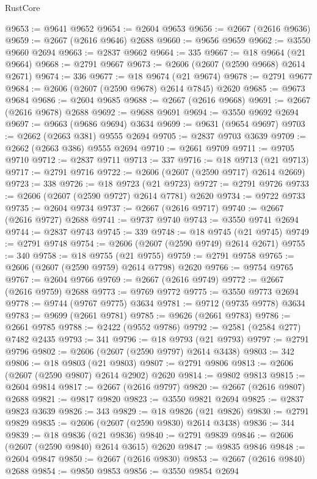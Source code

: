 \begin{lexlean}{RustCore}
\begin{coremodule}
@9653 := @9641 @9652
@9654 := @2604 @9653
@9656 := @2667 (@2616 @9636)
@9659 := @2667 (@2616 @9646) @2688
@9660 := @9656 @9659
@9662 := @3550 @9660 @2694
@9663 := @2837 @9662
@9664 := 335
@9667 := @18 @9664 (@21 @9664)
@9668 := @2791 @9667
@9673 := @2606 (@2607 (@2590 @9668) @2614 @2671)
@9674 := 336
@9677 := @18 @9674 (@21 @9674)
@9678 := @2791 @9677
@9684 := @2606 (@2607 (@2590 @9678) @2614 @7845) @2620
@9685 := @9673 @9684
@9686 := @2604 @9685
@9688 := @2667 (@2616 @9668)
@9691 := @2667 (@2616 @9678) @2688
@9692 := @9688 @9691
@9694 := @3550 @9692 @2694
@9697 := @9663 (@9686 @9694) @3634
@9699 := @9631 (@9654 @9697)
@9703 := @2662 (@2663 @381) @9555 @2694
@9705 := @2837 @9703 @3639
@9709 := @2662 (@2663 @386) @9555 @2694
@9710 := @2661 @9709
@9711 := @9705 @9710
@9712 := @2837 @9711
@9713 := 337
@9716 := @18 @9713 (@21 @9713)
@9717 := @2791 @9716
@9722 := @2606 (@2607 (@2590 @9717) @2614 @2669)
@9723 := 338
@9726 := @18 @9723 (@21 @9723)
@9727 := @2791 @9726
@9733 := @2606 (@2607 (@2590 @9727) @2614 @7781) @2620
@9734 := @9722 @9733
@9735 := @2604 @9734
@9737 := @2667 (@2616 @9717)
@9740 := @2667 (@2616 @9727) @2688
@9741 := @9737 @9740
@9743 := @3550 @9741 @2694
@9744 := @2837 @9743
@9745 := 339
@9748 := @18 @9745 (@21 @9745)
@9749 := @2791 @9748
@9754 := @2606 (@2607 (@2590 @9749) @2614 @2671)
@9755 := 340
@9758 := @18 @9755 (@21 @9755)
@9759 := @2791 @9758
@9765 := @2606 (@2607 (@2590 @9759) @2614 @7798) @2620
@9766 := @9754 @9765
@9767 := @2604 @9766
@9769 := @2667 (@2616 @9749)
@9772 := @2667 (@2616 @9759) @2688
@9773 := @9769 @9772
@9775 := @3550 @9773 @2694
@9778 := @9744 (@9767 @9775) @3634
@9781 := @9712 (@9735 @9778) @3634
@9783 := @9699 (@2661 @9781)
@9785 := @9626 (@2661 @9783)
@9786 := @2661 @9785
@9788 := @2422 (@9552 @9786)
@9792 := @2581 (@2584 @277) @7482 @2435
@9793 := 341
@9796 := @18 @9793 (@21 @9793)
@9797 := @2791 @9796
@9802 := @2606 (@2607 (@2590 @9797) @2614 @3438)
@9803 := 342
@9806 := @18 @9803 (@21 @9803)
@9807 := @2791 @9806
@9813 := @2606 (@2607 (@2590 @9807) @2614 @2902) @2620
@9814 := @9802 @9813
@9815 := @2604 @9814
@9817 := @2667 (@2616 @9797)
@9820 := @2667 (@2616 @9807) @2688
@9821 := @9817 @9820
@9823 := @3550 @9821 @2694
@9825 := @2837 @9823 @3639
@9826 := 343
@9829 := @18 @9826 (@21 @9826)
@9830 := @2791 @9829
@9835 := @2606 (@2607 (@2590 @9830) @2614 @3438)
@9836 := 344
@9839 := @18 @9836 (@21 @9836)
@9840 := @2791 @9839
@9846 := @2606 (@2607 (@2590 @9840) @2614 @3615) @2620
@9847 := @9835 @9846
@9848 := @2604 @9847
@9850 := @2667 (@2616 @9830)
@9853 := @2667 (@2616 @9840) @2688
@9854 := @9850 @9853
@9856 := @3550 @9854 @2694

\end{coremodule}
\end{lexlean}
